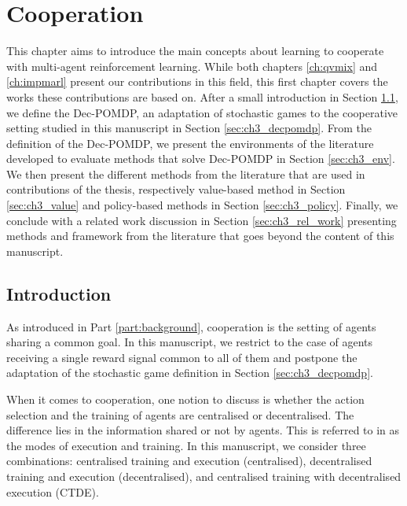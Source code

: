 \chapter{Cooperation}\label{ch:cooperation}
\begin{chapter_outline}

This chapter aims to introduce the main concepts about learning to cooperate with multi-agent reinforcement learning.
While both chapters \ref{ch:qvmix} and \ref{ch:impmarl} present our contributions in this field, this first chapter covers the works these contributions are based on.
After a small introduction in Section \ref{sec:ch3_intro}, we define the Dec-POMDP, an adaptation of stochastic games to the cooperative setting studied in this manuscript in Section \ref{sec:ch3_decpomdp}.
From the definition of the Dec-POMDP, we present the environments of the literature developed to evaluate methods that solve Dec-POMDP in Section \ref{sec:ch3_env}.
We then present the different methods from the literature that are used in contributions of the thesis, respectively value-based method in Section \ref{sec:ch3_value} and policy-based methods in Section \ref{sec:ch3_policy}.
Finally, we conclude with a related work discussion in Section \ref{sec:ch3_rel_work} presenting methods and framework from the literature that goes beyond the content of this manuscript.

\end{chapter_outline}


\section{Introduction}
\label{sec:ch3_intro}
As introduced in Part \ref{part:background}, cooperation is the setting of agents sharing a common goal.
In this manuscript, we restrict to the case of agents receiving a single reward signal common to all of them and postpone the adaptation of the stochastic game definition in Section \ref{sec:ch3_decpomdp}.

When it comes to cooperation, one notion to discuss is whether the action selection and the training of agents are centralised or decentralised.
The difference lies in the information shared or not by agents.
This is referred to in \cite{marl-book} as the modes of execution and training.
In this manuscript, we consider three combinations: centralised training and execution (centralised), decentralised training and execution (decentralised), and centralised training with decentralised execution (CTDE).

